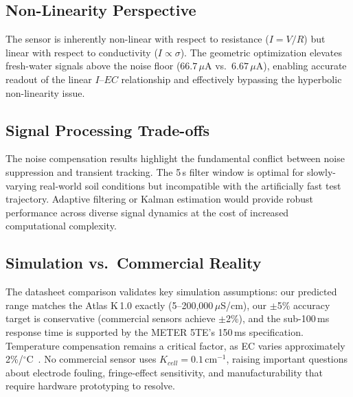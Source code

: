 \documentclass[conference]{IEEEtran}
\begin{document}
\subsection{Non-Linearity Perspective}
The sensor is inherently non-linear with respect to resistance ($I = V/R$) but linear with respect to conductivity ($I \propto \sigma$). The geometric optimization elevates fresh-water signals above the noise floor ($66.7\,\mu$A vs.\ $6.67\,\mu$A), enabling accurate readout of the linear $I$--$EC$ relationship and effectively bypassing the hyperbolic non-linearity issue.

\subsection{Signal Processing Trade-offs}
The noise compensation results highlight the fundamental conflict between noise suppression and transient tracking. The 5\,s filter window is optimal for slowly-varying real-world soil conditions but incompatible with the artificially fast test trajectory. Adaptive filtering or Kalman estimation would provide robust performance across diverse signal dynamics at the cost of increased computational complexity.

\subsection{Simulation vs.\ Commercial Reality}
The datasheet comparison validates key simulation assumptions: our predicted range matches the Atlas K\,1.0 exactly (5--200{,}000\,$\mu$S/cm), our $\pm$5\% accuracy target is conservative (commercial sensors achieve $\pm$2\%), and the sub-100\,ms response time is supported by the METER 5TE's 150\,ms specification. Temperature compensation remains a critical factor, as EC varies approximately 2\%/$^\circ$C~\cite{hayashi2004}. No commercial sensor uses $K_{cell} = 0.1\,\text{cm}^{-1}$, raising important questions about electrode fouling, fringe-effect sensitivity, and manufacturability that require hardware prototyping to resolve.
\end{document}
